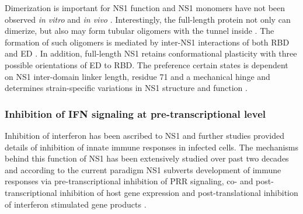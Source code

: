 		Dimerization is important for \gls{NS1} function and \gls{NS1} monomers have not been observed \textit{in vitro} and \textit{in vivo} \parencite{Hale2014}. Interestingly, the full-length protein not only can dimerize, but also may form tubular oligomers with the tunnel inside \parencite{Bornholdt2008}. The formation of such oligomers is mediated by inter-NS1 interactions of both \gls{RBD} and \gls{ED} \parencite{Bornholdt2008, Carrillo2014}. In addition, full-length \gls{NS1} retains conformational plasticity with three possible orientations of \gls{ED} to \gls{RBD}. The preference certain states is dependent on \gls{NS1} inter-domain linker length, residue 71 and a mechanical hinge and determines strain-specific variations in \gls{NS1} structure and function \parencite{Carrillo2014}.
		
	
		\subsubsection{Inhibition of IFN signaling at pre-transcriptional level}
		
		Inhibition of interferon has been ascribed to NS1 and further studies provided details of inhibition of innate immune responses in infected cells. The mechanisms behind this function of NS1 has been extensively studied over past two decades and according to the current paradigm NS1 subverts development of immune responses via pre-transcriptional inhibition of PRR signaling, co- and post-transcriptional inhibition of host gene expression and post-translational inhibition of interferon stimulated gene products \parencite{Ayllon2014}.		
		
